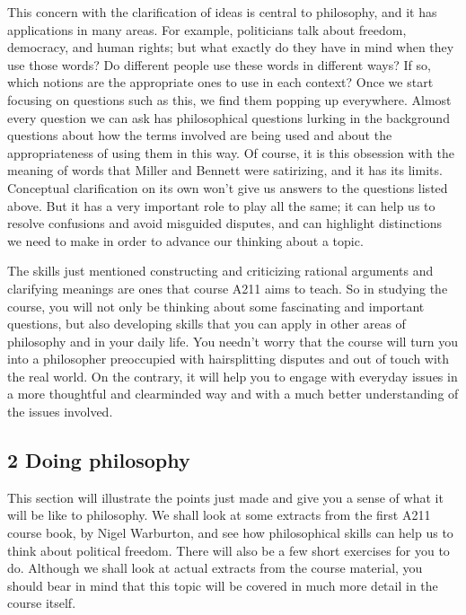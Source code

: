 \documentclass[letterpaper,10pt,english]{sphinxmanual}
\begin{document}
This concern with the clarification of ideas is central to philosophy, and it has applications in many areas. For example, politicians talk about freedom, democracy, and human rights; but what exactly do they have in mind when they use those words? Do different people use these words in different ways? If so, which notions are the appropriate ones to use in each context? Once we start focusing on questions such as this, we find them popping up everywhere. Almost every question we can ask has
philosophical questions lurking in the background \textendash{} questions about how the terms involved are being used and about the appropriateness of using them in this way. Of course, it is this obsession with the meaning of words that Miller and Bennett were satirizing, and it has its limits. Conceptual clarification on its own won’t give us answers to the questions listed above. But it has a very important role to play all the same; it can help us to resolve confusions and avoid misguided disputes, and
can highlight distinctions we need to make in order to advance our thinking about a topic.

The skills just mentioned \textendash{} constructing and criticizing rational arguments and clarifying meanings \textendash{} are ones that course A211 aims to teach. So in studying the course, you will not only be thinking about some fascinating and important questions, but also developing skills that you can apply in other areas of philosophy and in your daily life. You needn’t worry that the course will turn you into a  philosopher preoccupied with hair\sphinxhyphen{}splitting disputes and out of touch with the
real world. On the contrary, it will help you to engage with everyday issues in a more thoughtful and clear\sphinxhyphen{}minded way and with a much better understanding of the issues involved.


\subsection{2 Doing philosophy}
\label{\detokenize{content/session_00/Part_00_02:2-Doing-philosophy}}\label{\detokenize{content/session_00/Part_00_02::doc}}
This section will illustrate the points just made and give you a sense of what it will be like to  philosophy. We shall look at some extracts from the first A211 course book,  by Nigel Warburton, and see how philosophical skills can help us to think about political freedom. There will also be a few short exercises for you to do. Although we shall look at actual extracts from the course material, you should bear in mind that this topic will be covered in much more
detail in the course itself.
\end{document}
